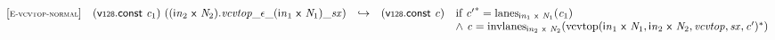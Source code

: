 \vspace{1ex}

$$
\begin{array}{@{}l@{}lcl@{}l@{}}
{[\textsc{\scriptsize E{-}vcvtop{-}normal}]} \quad & (\mathsf{v{\scriptstyle128}}.\mathsf{const}~{\mathit{c}}_{{1}})~(({{\mathsf{i}}{{\mathit{n}}}}_{{2}}~\mathsf{x}~{\mathit{N}}_{{2}}) . {{{{{{{\mathit{vcvtop}}}{\mathsf{\_}}}{\epsilon}}{\mathsf{\_}}}{({{\mathsf{i}}{{\mathit{n}}}}_{{1}}~\mathsf{x}~{\mathit{N}}_{{1}})}}{\mathsf{\_}}}{{\mathit{sx}}}) &\hookrightarrow& (\mathsf{v{\scriptstyle128}}.\mathsf{const}~{\mathit{c}}) &\quad
  \mbox{if}~{{\mathit{c}'}^\ast} = {{\mathrm{lanes}}}_{{{\mathsf{i}}{{\mathit{n}}}}_{{1}}~\mathsf{x}~{\mathit{N}}_{{1}}}({\mathit{c}}_{{1}}) \\
 &&&&\quad {\land}~{\mathit{c}} = {{\mathrm{invlanes}}}_{{{\mathsf{i}}{{\mathit{n}}}}_{{2}}~\mathsf{x}~{\mathit{N}}_{{2}}}({{\mathrm{vcvtop}}({{\mathsf{i}}{{\mathit{n}}}}_{{1}}~\mathsf{x}~{\mathit{N}}_{{1}}, {{\mathsf{i}}{{\mathit{n}}}}_{{2}}~\mathsf{x}~{\mathit{N}}_{{2}}, {\mathit{vcvtop}}, {\mathit{sx}}, {\mathit{c}'})^\ast}) \\
\end{array}
$$


